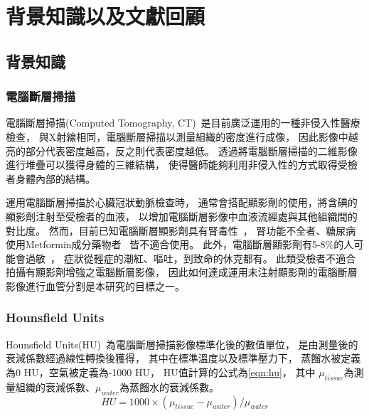 \documentclass[class=NCU_thesis, crop=false]{standalone}
\begin{document}
\chapter{背景知識以及文獻回顧}

\section{背景知識}
\subsection{電腦斷層掃描}
電腦斷層掃描(Computed Tomography, CT)~\cite{nadrljanskiComputedTomographyRadiology,mckavanaghEssentialsCardiacComputerized2015}是目前廣泛運用的一種非侵入性醫療檢查，
與X射線相同，電腦斷層掃描以測量組織的密度進行成像，
因此影像中越亮的部分代表密度越高，反之則代表密度越低。
透過將電腦斷層掃描的二維影像進行堆疊可以獲得身體的三維結構，
使得醫師能夠利用非侵入性的方式取得受檢者身體內部的結構。

運用電腦斷層掃描於心臟冠狀動脈檢查時，
通常會搭配顯影劑的使用，將含碘的顯影劑注射至受檢者的血液，
以增加電腦斷層影像中血液流經處與其他組織間的對比度。
然而，目前已知電腦斷層顯影劑具有腎毒性~\cite{andreucciUpdateRenalToxicity2017}，
腎功能不全者、糖尿病使用Metformin成分藥物者~\cite{rasuliMetforminContrastMedia1998}
皆不適合使用。
此外，電腦斷層顯影劑有5-8\%的人可能會過敏~\cite{saljoughianIntravenousRadiocontrastMedia2012}，
症狀從輕症的潮紅、嘔吐，到致命的休克都有。
此類受檢者不適合拍攝有顯影劑增強之電腦斷層影像，
因此如何達成運用未注射顯影劑的電腦斷層影像進行血管分割是本研究的目標之一。

\subsection{Hounsfield Units}
Hounsfield Units(HU)~\cite{greenwayHounsfieldUnitRadiology,levCTAngiographyCT2002,murphyWindowingCTRadiology}為電腦斷層掃描影像標準化後的數值單位，
是由測量後的衰減係數經過線性轉換後獲得，
其中在標準溫度以及標準壓力下，
蒸餾水被定義為0 HU，空氣被定義為-1000 HU，
HU值計算的公式為\cref{eqn:hu}，
其中 $\mu _{tissue}$為測量組織的衰減係數、$\mu _{water}$為蒸餾水的衰減係數。
\begin{equation}
\label{eqn:hu}
HU = 1000 \times (\mu _{tissue}-\mu _{water})/\mu _{water}
\end{equation}
\end{document}

